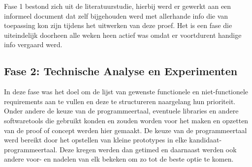 
Fase 1 bestond zich uit de literatuurstudie, hierbij werd er gewerkt aan een informeel document dat zelf bijgehouden werd met allerhande info die van toepassing kon zijn tijdens het uitwerken van deze proef. Het is een fase die uiteindelijk doorheen alle weken heen actief was omdat er voortdurent handige info vergaard werd.

\subsection{Fase 2: Technische Analyse en Experimenten}
In deze fase was het doel om de lijst van gewenste functionele en niet-functionele requirements aan te vullen en deze te structureren naargelang hun prioriteit. Onder andere de keuze van de programmeertaal, eventuele libraries en andere softwaretools die gebruikt konden en zouden worden voor het maken en opzetten van de proof of concept werden hier gemaakt. De keuze van de programmeertaal werd bereikt door het opstellen van kleine prototypes in elke kandidaat-programmeertaal. Deze kregen werden dan getimed en daarnaast werden ook andere voor- en nadelen van elk bekeken om zo tot de beste optie te komen.


